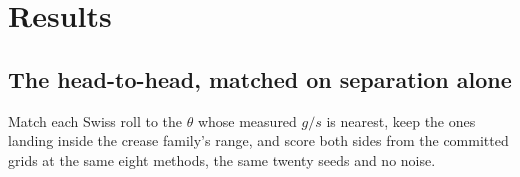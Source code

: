 \documentclass[
  british,
  a4paper,
]{book}
\newenvironment{Shaded}{\begin{snugshade}}{\end{snugshade}}
\newcommand{\ControlFlowTok}[1]{\textcolor[rgb]{0.13,0.29,0.53}{\textbf{#1}}}
\newcommand{\DecValTok}[1]{\textcolor[rgb]{0.00,0.00,0.81}{#1}}
\newcommand{\FunctionTok}[1]{\textcolor[rgb]{0.13,0.29,0.53}{\textbf{#1}}}
\newcommand{\NormalTok}[1]{#1}
\newcommand{\OtherTok}[1]{\textcolor[rgb]{0.56,0.35,0.01}{#1}}
\newcommand{\SpecialCharTok}[1]{\textcolor[rgb]{0.81,0.36,0.00}{\textbf{#1}}}
\newcommand{\StringTok}[1]{\textcolor[rgb]{0.31,0.60,0.02}{#1}}
\begin{document}
\section{Results}\label{comp-results}

\subsection{The head-to-head, matched on separation alone}\label{the-head-to-head-matched-on-separation-alone}

Match each Swiss roll to the \(\theta\) whose measured \(g/s\) is nearest, keep the
ones landing inside the crease family's range, and score both sides from the
committed grids at the same eight methods, the same twenty seeds and no noise.

\begin{Shaded}
\end{Shaded}
\end{document}
